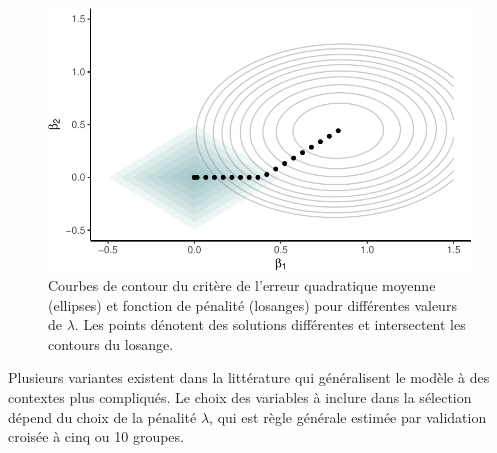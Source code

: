 \documentclass[
  11pt,
  letterpaper,
]{scrbook}
\theoremstyle{definition}
\theoremstyle{remark}
\begin{document}
\begin{figure}[ht!]

{\centering \includegraphics{./04-selectionmodeles_files/figure-pdf/fig-lassopenalty-1.pdf}

}

\caption{\label{fig-lassopenalty}Courbes de contour du critère de
l'erreur quadratique moyenne (ellipses) et fonction de pénalité
(losanges) pour différentes valeurs de \(\lambda\). Les points dénotent
des solutions différentes et intersectent les contours du losange.}

\end{figure}

Plusieurs variantes existent dans la littérature qui généralisent le
modèle à des contextes plus compliqués. Le choix des variables à inclure
dans la sélection dépend du choix de la pénalité \(\lambda\), qui est
règle générale estimée par validation croisée à cinq ou 10 groupes.
\end{document}

